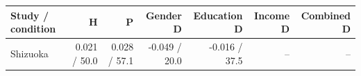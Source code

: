 
\begin{tabular}{lrrrrrr}
\toprule
Study / condition & H & P & Gender D & Education D & Income D & Combined D\\
\midrule
Shizuoka & 0.021 / 50.0 & 0.028 / 57.1 & -0.049 / 20.0 & -0.016 / 37.5 & -- & --\\
\bottomrule
\end{tabular}
